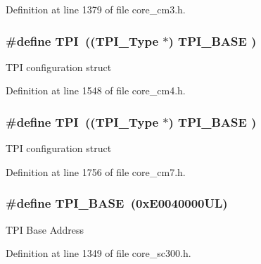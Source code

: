 Definition at line 1379 of file core\+\_\+cm3.\+h.

\subsubsection[{\texorpdfstring{T\+PI}{TPI}}]{\setlength{\rightskip}{0pt plus 5cm}\#define T\+PI~(({\bf T\+P\+I\+\_\+\+Type}       $\ast$)     {\bf T\+P\+I\+\_\+\+B\+A\+SE}      )}\hypertarget{group___c_m_s_i_s__core__base_ga8b4dd00016aed25a0ea54e9a9acd1239}{}\label{group___c_m_s_i_s__core__base_ga8b4dd00016aed25a0ea54e9a9acd1239}
T\+PI configuration struct 

Definition at line 1548 of file core\+\_\+cm4.\+h.

\subsubsection[{\texorpdfstring{T\+PI}{TPI}}]{\setlength{\rightskip}{0pt plus 5cm}\#define T\+PI~(({\bf T\+P\+I\+\_\+\+Type}       $\ast$)     {\bf T\+P\+I\+\_\+\+B\+A\+SE}      )}\hypertarget{group___c_m_s_i_s__core__base_ga8b4dd00016aed25a0ea54e9a9acd1239}{}\label{group___c_m_s_i_s__core__base_ga8b4dd00016aed25a0ea54e9a9acd1239}
T\+PI configuration struct 

Definition at line 1756 of file core\+\_\+cm7.\+h.

\subsubsection[{\texorpdfstring{T\+P\+I\+\_\+\+B\+A\+SE}{TPI_BASE}}]{\setlength{\rightskip}{0pt plus 5cm}\#define T\+P\+I\+\_\+\+B\+A\+SE~(0x\+E0040000\+U\+L)}\hypertarget{group___c_m_s_i_s__core__base_ga2b1eeff850a7e418844ca847145a1a68}{}\label{group___c_m_s_i_s__core__base_ga2b1eeff850a7e418844ca847145a1a68}
T\+PI Base Address 

Definition at line 1349 of file core\+\_\+sc300.\+h.


